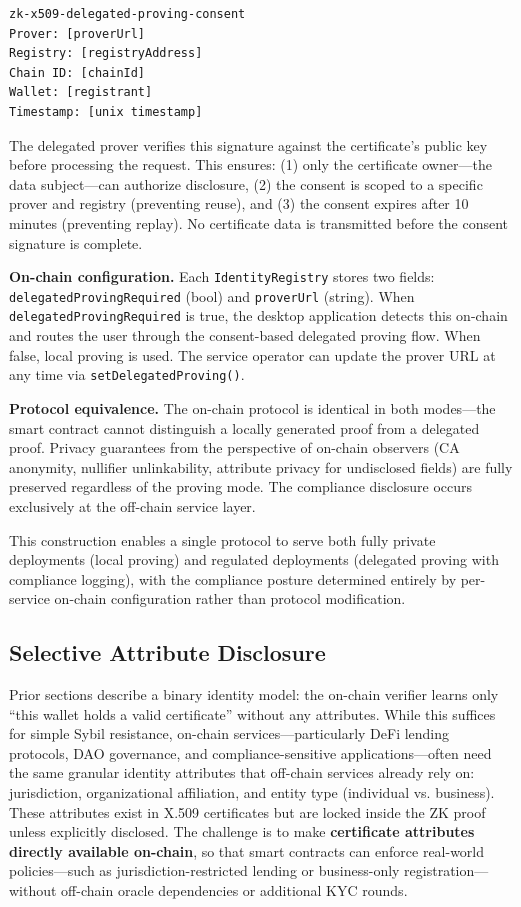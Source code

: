 \documentclass[11pt, a4paper]{article}
\begin{document}
\begin{verbatim}
zk-x509-delegated-proving-consent
Prover: [proverUrl]
Registry: [registryAddress]
Chain ID: [chainId]
Wallet: [registrant]
Timestamp: [unix timestamp]
\end{verbatim}

The delegated prover verifies this signature against the certificate's
public key before processing the request. This ensures: (1) only the
certificate owner---the data subject---can authorize disclosure, (2) the
consent is scoped to a specific prover and registry (preventing reuse),
and (3) the consent expires after 10 minutes (preventing replay). No
certificate data is transmitted before the consent signature is complete.

\textbf{On-chain configuration.} Each \texttt{IdentityRegistry} stores
two fields: \texttt{delegatedProvingRequired} (bool) and
\texttt{proverUrl} (string). When \texttt{delegatedProvingRequired} is
true, the desktop application detects this on-chain and routes the user
through the consent-based delegated proving flow. When false, local
proving is used. The service operator can update the prover URL at any
time via \texttt{setDelegatedProving()}.

\textbf{Protocol equivalence.} The on-chain protocol is identical in
both modes---the smart contract cannot distinguish a locally generated
proof from a delegated proof. Privacy guarantees from the perspective
of on-chain observers (CA anonymity, nullifier unlinkability, attribute
privacy for undisclosed fields) are fully preserved regardless of the
proving mode. The compliance disclosure occurs exclusively at the
off-chain service layer.

This construction enables a single protocol to serve both fully private
deployments (local proving) and regulated deployments (delegated proving
with compliance logging), with the compliance posture determined entirely
by per-service on-chain configuration rather than protocol modification.

\subsection{Selective Attribute
Disclosure}\label{selective-attribute-disclosure}

Prior sections describe a binary identity model: the on-chain verifier
learns only ``this wallet holds a valid certificate'' without any
attributes. While this suffices for simple Sybil resistance,
on-chain services---particularly DeFi lending protocols, DAO governance,
and compliance-sensitive applications---often need the same granular
identity attributes that off-chain services already rely on:
jurisdiction, organizational affiliation, and entity type (individual vs.
business). These attributes exist in X.509 certificates but are locked
inside the ZK proof unless explicitly disclosed.
The challenge is to make \textbf{certificate attributes directly
available on-chain}, so that smart contracts can enforce real-world
policies---such as jurisdiction-restricted lending or business-only
registration---without off-chain oracle dependencies or additional KYC
rounds.
\end{document}
